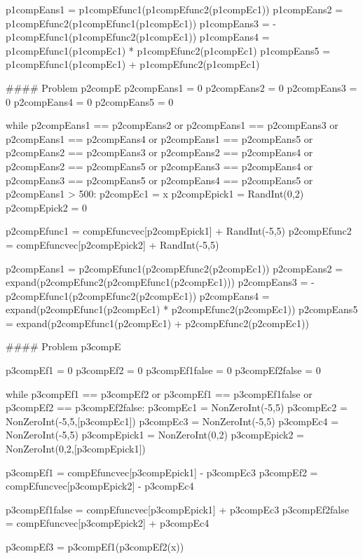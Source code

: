 \documentclass{ximera}
\begin{document}
\begin{MCQuestions}
\begin{sagesilent}
    p1compEans1 = p1compEfunc1(p1compEfunc2(p1compEc1))
    p1compEans2 = p1compEfunc2(p1compEfunc1(p1compEc1))
    p1compEans3 = -p1compEfunc1(p1compEfunc2(p1compEc1))
    p1compEans4 = p1compEfunc1(p1compEc1) * p1compEfunc2(p1compEc1)
    p1compEans5 = p1compEfunc1(p1compEc1) + p1compEfunc2(p1compEc1)


#### Problem p2compE
p2compEans1 = 0
p2compEans2 = 0
p2compEans3 = 0
p2compEans4 = 0
p2compEans5 = 0

while p2compEans1 == p2compEans2 or p2compEans1 == p2compEans3 or p2compEans1 == p2compEans4 or p2compEans1 == p2compEans5 or p2compEans2 == p2compEans3 or p2compEans2 == p2compEans4 or p2compEans2 == p2compEans5 or p2compEans3 == p2compEans4 or p2compEans3 == p2compEans5 or p2compEans4 == p2compEans5 or p2compEans1 > 500:
    p2compEc1 = x
    p2compEpick1 = RandInt(0,2)
    p2compEpick2 = 0
    
    p2compEfunc1 = compEfuncvec[p2compEpick1] + RandInt(-5,5)
    p2compEfunc2 = compEfuncvec[p2compEpick2] + RandInt(-5,5)
    
    p2compEans1 = p2compEfunc1(p2compEfunc2(p2compEc1))
    p2compEans2 = expand(p2compEfunc2(p2compEfunc1(p2compEc1)))
    p2compEans3 = -p2compEfunc1(p2compEfunc2(p2compEc1))
    p2compEans4 = expand(p2compEfunc1(p2compEc1) * p2compEfunc2(p2compEc1))
    p2compEans5 = expand(p2compEfunc1(p2compEc1) + p2compEfunc2(p2compEc1))


#### Problem p3compE

p3compEf1 = 0
p3compEf2 = 0
p3compEf1false = 0
p3compEf2false = 0

while p3compEf1 == p3compEf2 or p3compEf1 == p3compEf1false or p3compEf2 == p3compEf2false:
    p3compEc1 = NonZeroInt(-5,5)
    p3compEc2 = NonZeroInt(-5,5,[p3compEc1])
    p3compEc3 = NonZeroInt(-5,5)
    p3compEc4 = NonZeroInt(-5,5)
    p3compEpick1 = NonZeroInt(0,2)
    p3compEpick2 = NonZeroInt(0,2,[p3compEpick1])
    
    p3compEf1 = compEfuncvec[p3compEpick1] - p3compEc3
    p3compEf2 = compEfuncvec[p3compEpick2] - p3compEc4
    
    p3compEf1false = compEfuncvec[p3compEpick1] + p3compEc3
    p3compEf2false = compEfuncvec[p3compEpick2] + p3compEc4
    
    p3compEf3 = p3compEf1(p3compEf2(x))



\end{sagesilent}



\end{MCQuestions}
\end{document}
